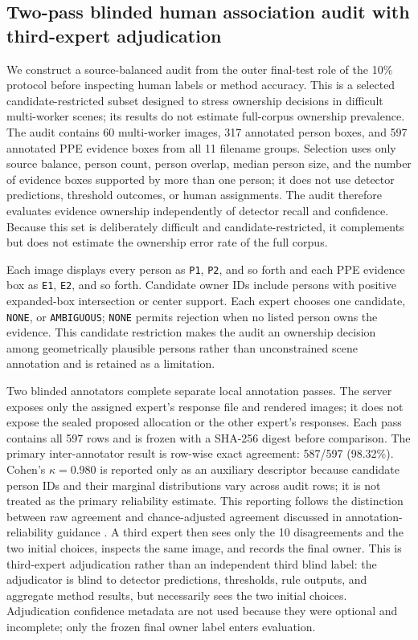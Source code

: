 \documentclass[iicol,pdflatex,sn-mathphys-num]{sn-jnl}
\begin{document}
\subsection{Two-pass blinded human association audit with third-expert adjudication}\label{sec:humanprotocol}

We construct a source-balanced audit from the outer final-test role of the 10\% protocol before inspecting human labels or method accuracy. This is a selected candidate-restricted subset designed to stress ownership decisions in difficult multi-worker scenes; its results do not estimate full-corpus ownership prevalence. The audit contains 60 multi-worker images, 317 annotated person boxes, and 597 annotated PPE evidence boxes from all 11 filename groups. Selection uses only source balance, person count, person overlap, median person size, and the number of evidence boxes supported by more than one person; it does not use detector predictions, threshold outcomes, or human assignments. The audit therefore evaluates evidence ownership independently of detector recall and confidence. Because this set is deliberately difficult and candidate-restricted, it complements but does not estimate the ownership error rate of the full corpus.

Each image displays every person as \texttt{P1}, \texttt{P2}, and so forth and each PPE evidence box as \texttt{E1}, \texttt{E2}, and so forth. Candidate owner IDs include persons with positive expanded-box intersection or center support. Each expert chooses one candidate, \texttt{NONE}, or \texttt{AMBIGUOUS}; \texttt{NONE} permits rejection when no listed person owns the evidence. This candidate restriction makes the audit an ownership decision among geometrically plausible persons rather than unconstrained scene annotation and is retained as a limitation.

Two blinded annotators complete separate local annotation passes. The server exposes only the assigned expert's response file and rendered images; it does not expose the sealed proposed allocation or the other expert's responses. Each pass contains all 597 rows and is frozen with a SHA-256 digest before comparison. The primary inter-annotator result is row-wise exact agreement: 587/597 (98.32\%). Cohen's $\kappa=0.980$ is reported only as an auxiliary descriptor because candidate person IDs and their marginal distributions vary across audit rows; it is not treated as the primary reliability estimate. This reporting follows the distinction between raw agreement and chance-adjusted agreement discussed in annotation-reliability guidance \cite{artstein2008intercoder,mchugh2012kappa}. A third expert then sees only the 10 disagreements and the two initial choices, inspects the same image, and records the final owner. This is third-expert adjudication rather than an independent third blind label: the adjudicator is blind to detector predictions, thresholds, rule outputs, and aggregate method results, but necessarily sees the two initial choices. Adjudication confidence metadata are not used because they were optional and incomplete; only the frozen final owner label enters evaluation.
\end{document}
